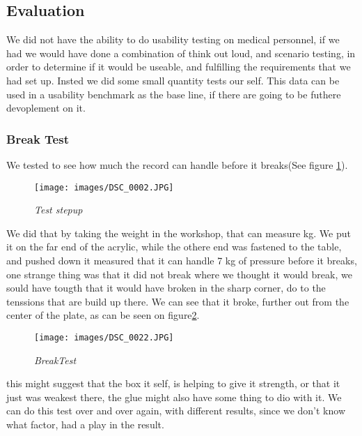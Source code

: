 \subsection{Evaluation}
We did not have the ability to do usability testing on medical personnel, if we had we would have done a combination of think out loud, and scenario testing, in order to determine if it would be useable, and fulfilling the requirements that we had set up.
Insted we did some small quantity tests our self.
This data can be used in a usability benchmark as the base line, if there are going to be futhere devoplement on it.

\subsubsection{Break Test}
We tested to see how much the record can handle before it breaks(See figure \ref{fig:BreakTest1}).
\begin{figure}[h]
	\begin{center}
	\texttt{[image: images/DSC\_0002.JPG]}
	\caption{\small {\it {Test stepup}}} \label{fig:BreakTest1}
	\end{center}
\end{figure}
We did that by taking the weight in the workshop, that can measure kg. We put it on the far end of the acrylic, while the othere end was fastened to the table, and pushed down it measured that it can handle 7 kg of pressure before it breaks, one strange thing was that it did not break where we thought it would break, we sould have tougth that it would have broken in the sharp corner\cite{AcrylTension}, do to the tenssions that are build up there. We can see that it broke, further out from the center of the plate, as can be seen on figure\ref{fig:BreakTest2}.
\begin{figure}[h]
	\begin{center}
	\texttt{[image: images/DSC\_0022.JPG]}
	\caption{\small {\it {BreakTest}}} \label{fig:BreakTest2}
	\end{center}
\end{figure}
this might suggest that the box it self, is helping to give it strength, or that it just was weakest there, the glue might also have some thing to dio with it.
We can do this test over and over again, with different results, since we don't know what factor, had a play in the result.

